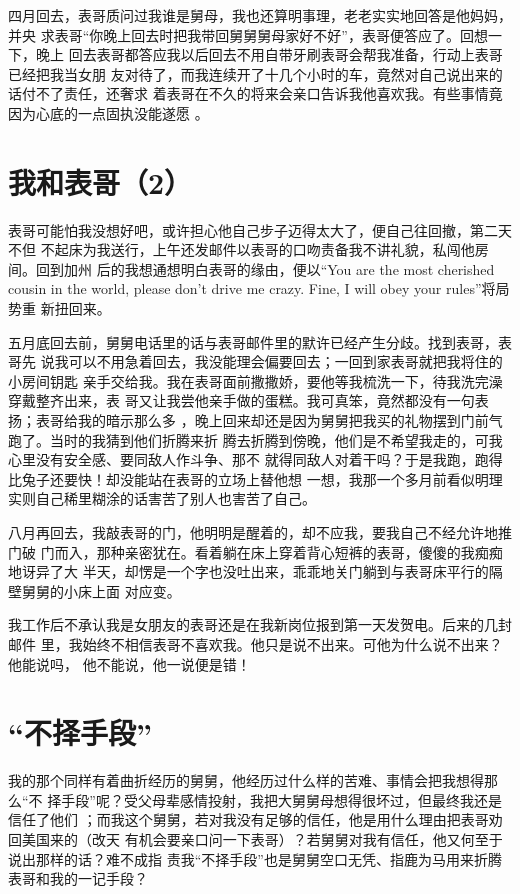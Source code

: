 \documentclass[12pt]{book}
\begin{document}
四月回去，表哥质问过我谁是舅母，我也还算明事理，老老实实地回答是他妈妈，并央
求表哥“你晚上回去时把我带回舅舅舅母家好不好”，表哥便答应了。回想一下，晚上
回去表哥都答应我以后回去不用自带牙刷表哥会帮我准备，行动上表哥已经把我当女朋
友对待了，而我连续开了十几个小时的车，竟然对自己说出来的话付不了责任，还奢求
着表哥在不久的将来会亲口告诉我他喜欢我。有些事情竟因为心底的一点固执没能遂愿
。
\section{我和表哥（2）}
\label{sec-9-86}

表哥可能怕我没想好吧，或许担心他自己步子迈得太大了，便自己往回撤，第二天不但
不起床为我送行，上午还发邮件以表哥的口吻责备我不讲礼貌，私闯他房间。回到加州
后的我想通想明白表哥的缘由，便以“You are the most cherished cousin in the 
world, please don’t drive me crazy. Fine, I will obey your rules”将局势重
新扭回来。

五月底回去前，舅舅电话里的话与表哥邮件里的默许已经产生分歧。找到表哥，表哥先
说我可以不用急着回去，我没能理会偏要回去；一回到家表哥就把我将住的小房间钥匙
亲手交给我。我在表哥面前撒撒娇，要他等我梳洗一下，待我洗完澡穿戴整齐出来，表
哥又让我尝他亲手做的蛋糕。我可真笨，竟然都没有一句表扬；表哥给我的暗示那么多
，晚上回来却还是因为舅舅把我买的礼物摆到门前气跑了。当时的我猜到他们折腾来折
腾去折腾到傍晚，他们是不希望我走的，可我心里没有安全感、要同敌人作斗争、那不
就得同敌人对着干吗？于是我跑，跑得比兔子还要快！却没能站在表哥的立场上替他想
一想，我那一个多月前看似明理实则自己稀里糊涂的话害苦了别人也害苦了自己。

八月再回去，我敲表哥的门，他明明是醒着的，却不应我，要我自己不经允许地推门破
门而入，那种亲密犹在。看着躺在床上穿着背心短裤的表哥，傻傻的我痴痴地讶异了大
半天，却愣是一个字也没吐出来，乖乖地关门躺到与表哥床平行的隔壁舅舅的小床上面
对应变。

我工作后不承认我是女朋友的表哥还是在我新岗位报到第一天发贺电。后来的几封邮件
里，我始终不相信表哥不喜欢我。他只是说不出来。可他为什么说不出来？他能说吗，
他不能说，他一说便是错！
\section{“不择手段”}
\label{sec-9-87}

我的那个同样有着曲折经历的舅舅，他经历过什么样的苦难、事情会把我想得那么“不
择手段”呢？受父母辈感情投射，我把大舅舅母想得很坏过，但最终我还是信任了他们
；而我这个舅舅，若对我没有足够的信任，他是用什么理由把表哥劝回美国来的（改天
有机会要亲口问一下表哥）？若舅舅对我有信任，他又何至于说出那样的话？难不成指
责我“不择手段”也是舅舅空口无凭、指鹿为马用来折腾表哥和我的一记手段？
\end{document}
